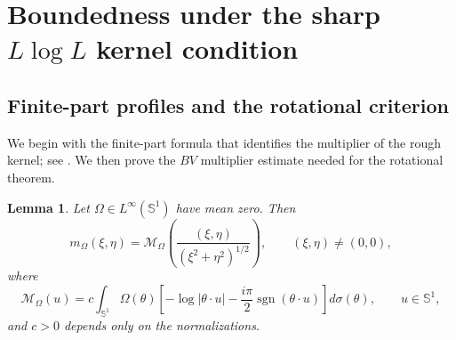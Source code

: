 \documentclass[11pt]{amsart}
\newtheorem{lemma}[definition]{Lemma}
\theoremstyle{remark}
\numberwithin{equation}{section}
\newcommand{\Sph}{\mathbb S^1}
\newcommand{\cM}{\mathcal M}
\newcommand{\sgn}{\operatorname{sgn}}
\begin{document}
	\section{Boundedness under the sharp \(L\log L\) kernel condition}
	
	\subsection{Finite-part profiles and the rotational criterion}
	
We begin with the finite-part formula that identifies the multiplier of the
rough kernel; see \cite[Proposition~4.2.3]{GrafakosClassical}.  We then prove
the \(BV\) multiplier estimate needed for the rotational theorem.
	
	\begin{lemma}
		\label{lem:finite-part}
		Let \(\Omega\in L^\infty(\Sph)\) have mean zero.  Then
		\[
		m_\Omega(\xi,\eta)=\cM_\Omega
		\left(\frac{(\xi,\eta)}{(\xi^2+\eta^2)^{1/2}}\right),
		\qquad (\xi,\eta)\ne(0,0),
		\]
		where
		\[
		\cM_\Omega(u)
		=
		c\int_{\Sph}\Omega(\theta)
		\left[-\log|\theta\cdot u|-\frac{i\pi}{2}\sgn(\theta\cdot u)\right]d\sigma(\theta),
		\qquad u\in \Sph,
		\]
		and \(c>0\) depends only on the normalizations.
	\end{lemma}
	
\end{document}
